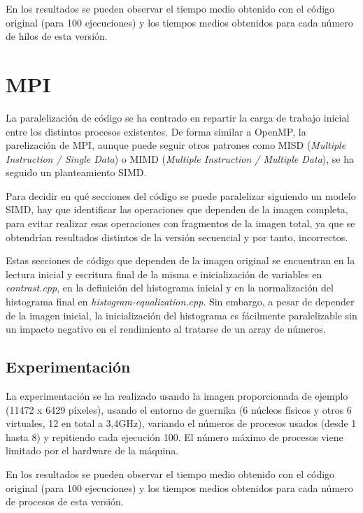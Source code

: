 \documentclass[12pt]{report} %
\begin{document}
En los resultados se pueden observar el tiempo medio obtenido con el código original (para 100 ejecuciones)
y los tiempos medios obtenidos para cada número de hilos de esta versión.

\section{MPI}
\label{sec:MPI}

La paralelización de código se ha centrado en repartir la carga de trabajo inicial entre los distintos
procesos existentes. De forma similar a OpenMP, la parelización de MPI, aunque puede seguir otros
patrones como MISD (\textit{Multiple Instruction / Single Data}) o MIMD (\textit{Multiple Instruction
/ Multiple Data}), se ha seguido un planteamiento SIMD.

Para decidir en qué secciones del código se puede paralelizar siguiendo un modelo SIMD, hay que identificar
las operaciones que dependen de la imagen completa, para evitar realizar esas operaciones con fragmentos de
la imagen total, ya que se obtendrían resultados distintos de la versión secuencial y por tanto, incorrectos.

Estas secciones de código que dependen de la imagen original se encuentran en la lectura inicial y escritura
final de la misma e inicialización de variables en \textit{contrast.cpp}, en la definición del histograma
inicial y en la normalización del histograma final en \textit{histogram-equalization.cpp}. Sin embargo,
a pesar de depender de la imagen inicial, la inicialización del histograma es fácilmente paralelizable sin
un impacto negativo en el rendimiento al tratarse de un array de números.


\subsection{Experimentación}

La experimentación se ha realizado usando la imagen proporcionada de ejemplo (11472 x 6429 píxeles),
usando el entorno de guernika (6 núcleos físicos y otros 6 virtuales, 12 en total a 3,4GHz), variando
el números de procesos usados (desde 1 hasta 8) y repitiendo cada ejecución 100. El número máximo
de procesos viene limitado por el hardware de la máquina.

En los resultados se pueden observar el tiempo medio obtenido con el código original (para 100 ejecuciones)
y los tiempos medios obtenidos para cada número de procesos de esta versión.
\end{document}
